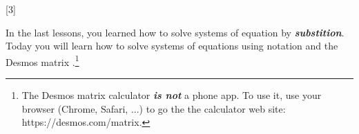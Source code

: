 



\renewcommand{\thechapter}{4} 
\renewcommand{\myCurrentChapterTitle}{Systems of Equations}

[3]

\begin{myObjectives}
\end{myObjectives}

\begin{myVocabulary}
\end{myVocabulary}

In the last lessons,
you learned how to solve systems of equation by {\bfseries\itshape substition}.
Today you will learn how to solve systems of equations using  
notation and the Desmos matrix .\footnote{
    The Desmos matrix calculator {\bfseries\itshape is not} a phone app.
    To use it, use your browser (Chrome, Safari, ...) to go the the calculator
    web site: {\ttfamily https://desmos.com/matrix}.
}



